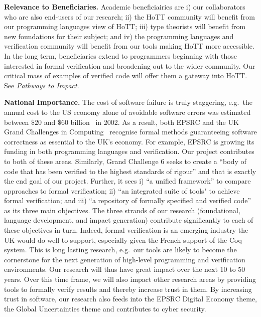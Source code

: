 \documentclass[a4paper,11pt]{article}
\newcommand{\eg}{{e.g.}\ }
\begin{document}
\vspace*{-0.1in}

{\bf Relevance to Beneficiaries.} Academic beneficiairies
are i) our collaborators who are also end-users of our research; ii)
the HoTT community will benefit from our programming languages
view of HoTT; iii) type theorists will benefit from new
foundations for their subject; and iv) the programming languages and
verification community will benefit from our tools making HoTT more
accessible. In the long term, beneficiaries extend to
programmers beginning with those interested in formal
verification and broadening out to the wider community. Our critical
mass of examples of verified code will offer them a gateway
into HoTT. See {\em Pathways to Impact}.
 

{\bf National Importance.} %
The cost of software failure is truly staggering, \eg the annual cost
to the US economy alone of avoidable software errors was estimated
between $\$ 20$ and $\$60$ billion~\cite{grandchallenges} in 2002.  As
a result, both EPSRC and the UK Grand Challenges in
Computing~\cite{grandchallenges} recognise formal methods guaranteeing
software correctness as essential to the UK's economy. For example,
EPSRC is growing its funding in both programming languages and
verification. Our project contributes to both of these
areas. Similarly, Grand Challenge 6 seeks to create a ``body of code
that has been verified to the highest standards of rigour'' and that
is exactly the end goal of our project. Further, it sees i) ``a
unified framework'' to compare approaches to formal verification; ii)
``an integrated suite of tools" to achieve formal verification; and
iii) ``a repository of formally specified and verified code'' as its
three main objectives. The three strands of our research
(foundational, language development, and impact generation) contribute
significantly to each of these objectives in turn.  Indeed, formal
verification is an emerging industry the UK would do well to support,
especially given %
the French support of the Coq system. This is long lasting research,
\eg our tools are likely to become the cornerstone for the next
generation of high-level programming and verification
environments. Our research will thus have great impact over the next
10 to 50 years.  Over this time frame, we will also impact other
research areas by providing tools to formally verify results and
thereby increase trust in them. By increasing trust in software, our
research also feeds into the EPSRC Digital Economy theme, the Global
Uncertainties theme and contributes to cyber security.
\end{document}
